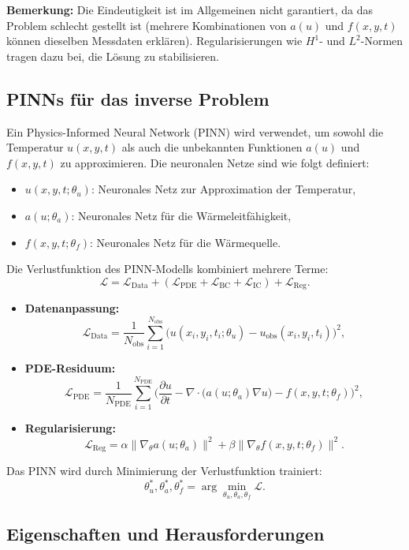 \textbf{Bemerkung:}  
Die Eindeutigkeit ist im Allgemeinen nicht garantiert, da das Problem schlecht gestellt ist (mehrere Kombinationen von \(a(u)\) und \(f(x, y, t)\) können dieselben Messdaten erklären). Regularisierungen wie \(H^1\)- und \(L^2\)-Normen tragen dazu bei, die Lösung zu stabilisieren.

\subsection{PINNs für das inverse Problem}

Ein Physics-Informed Neural Network (PINN) wird verwendet, um sowohl die Temperatur \(u(x, y, t)\) als auch die unbekannten Funktionen \(a(u)\) und \(f(x, y, t)\) zu approximieren. Die neuronalen Netze sind wie folgt definiert:
\begin{itemize}
	\item \(u(x, y, t; \theta_u)\): Neuronales Netz zur Approximation der Temperatur,
	\item \(a(u; \theta_a)\): Neuronales Netz für die Wärmeleitfähigkeit,
	\item \(f(x, y, t; \theta_f)\): Neuronales Netz für die Wärmequelle.
\end{itemize}

Die Verlustfunktion des PINN-Modells kombiniert mehrere Terme:
\[
\mathcal{L} = \mathcal{L}_\text{Data} + ( \mathcal{L}_\text{PDE} + \mathcal{L}_\text{BC} + \mathcal{L}_\text{IC} ) + \mathcal{L}_\text{Reg}.
\]
\begin{itemize}
	\item \textbf{Datenanpassung:}
	\[
	\mathcal{L}_\text{Data} = \frac{1}{N_\text{obs}} \sum_{i=1}^{N_\text{obs}} \big(u(x_i, y_i, t_i; \theta_u) - u_\text{obs}(x_i, y_i, t_i)\big)^2,
	\]
	\item \textbf{PDE-Residuum:}
	\[
	\mathcal{L}_\text{PDE} = \frac{1}{N_\text{PDE}} \sum_{i=1}^{N_\text{PDE}} \bigg(\frac{\partial u}{\partial t} - \nabla \cdot \big(a(u; \theta_a) \nabla u\big) - f(x, y, t; \theta_f)\bigg)^2,
	\]
	\item \textbf{Regularisierung:}
	\[
	\mathcal{L}_\text{Reg} = \alpha \|\nabla_\theta a(u; \theta_a)\|^2 + \beta \|\nabla_\theta f(x, y, t; \theta_f)\|^2.
	\]
\end{itemize}

Das PINN wird durch Minimierung der Verlustfunktion trainiert:
\[
\theta_u^*, \theta_a^*, \theta_f^* = \arg \min_{\theta_u, \theta_a, \theta_f} \mathcal{L}.
\]

\subsection{Eigenschaften und Herausforderungen}

